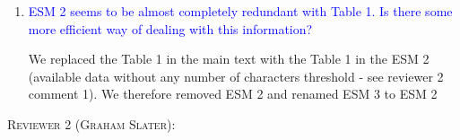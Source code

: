 \documentclass[12pt,letterpaper]{article}
\renewcommand{\section}[1]{%
\bigskip
\begin{center}
\begin{Large}
\normalfont\scshape #1
\medskip
\end{Large}
\end{center}}
\begin{document}
\begin{enumerate}
\item{\textcolor{blue}{ESM 2 seems to be almost completely redundant with Table 1. Is there some more efficient way of dealing with this information?}}

We replaced the Table 1 in the main text with the Table 1 in the ESM 2 (available data without any number of characters threshold - see reviewer 2 comment 1).
We therefore removed ESM 2 and renamed ESM 3 to ESM 2

\end{enumerate}


\section{Reviewer 2 (Graham Slater):} %
\end{document}

